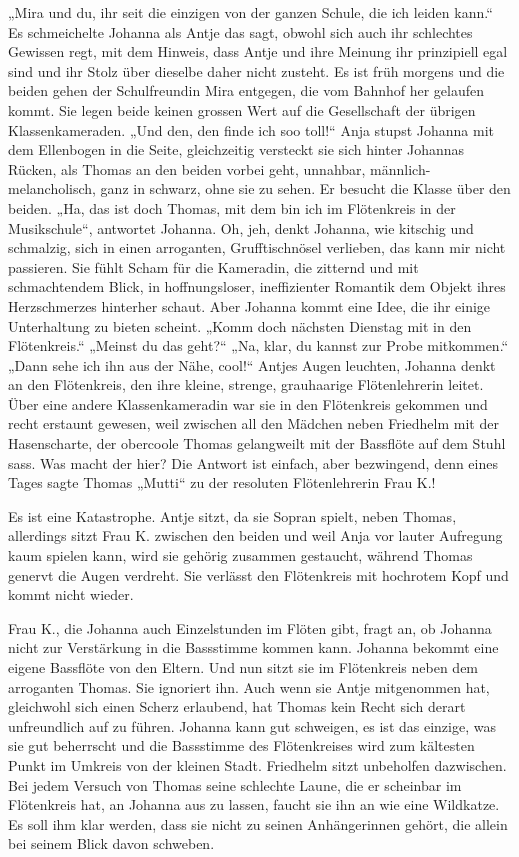 \documentclass[10pt,a5paper]{book}
\begin{document}
„Mira und du, ihr seit die einzigen von der ganzen Schule, die ich leiden kann.“ Es schmeichelte Johanna als Antje das sagt, obwohl sich auch ihr schlechtes Gewissen regt, mit dem Hinweis, dass Antje und ihre Meinung ihr prinzipiell egal sind und ihr Stolz über dieselbe daher  nicht zusteht. Es ist früh morgens und die beiden gehen der Schulfreundin Mira entgegen, die vom Bahnhof her gelaufen kommt. Sie legen beide keinen grossen Wert auf die Gesellschaft der übrigen Klassenkameraden. „Und den, den finde ich soo toll!“ Anja stupst Johanna mit dem Ellenbogen in die Seite, gleichzeitig versteckt sie sich hinter Johannas Rücken, als Thomas an den beiden vorbei geht, unnahbar, männlich-melancholisch, ganz in schwarz, ohne sie zu sehen. Er besucht die Klasse über den beiden. „Ha, das ist doch Thomas, mit dem bin ich im Flötenkreis in der Musikschule“, antwortet Johanna. Oh, jeh, denkt Johanna, wie kitschig und schmalzig, sich in einen arroganten, Grufftischnösel verlieben, das kann mir nicht passieren. Sie fühlt Scham für die Kameradin, die zitternd und mit schmachtendem Blick, in hoffnungsloser, ineffizienter Romantik dem Objekt ihres Herzschmerzes hinterher schaut. Aber Johanna kommt eine Idee, die ihr einige Unterhaltung zu bieten scheint. „Komm doch nächsten Dienstag mit in den Flötenkreis.“ „Meinst du das geht?“ „Na, klar, du kannst zur Probe mitkommen.“ „Dann sehe ich ihn aus der Nähe, cool!“ Antjes Augen leuchten, Johanna denkt an den Flötenkreis, den ihre kleine, strenge, grauhaarige Flötenlehrerin leitet. Über eine andere Klassenkameradin war sie in den Flötenkreis gekommen und recht erstaunt gewesen, weil zwischen all den Mädchen neben Friedhelm mit der Hasenscharte, der obercoole Thomas gelangweilt mit der Bassflöte auf dem Stuhl sass. Was macht der hier? Die Antwort  ist einfach, aber bezwingend, denn eines Tages sagte Thomas „Mutti“ zu der resoluten Flötenlehrerin Frau K.!

Es ist eine Katastrophe. Antje sitzt, da sie Sopran spielt, neben Thomas, allerdings sitzt Frau K. zwischen den beiden und weil Anja vor lauter Aufregung kaum spielen kann, wird sie gehörig zusammen gestaucht, während Thomas genervt die Augen verdreht. Sie verlässt den Flötenkreis mit hochrotem Kopf und kommt nicht wieder. 

Frau K., die Johanna auch Einzelstunden im Flöten gibt, fragt an, ob Johanna nicht zur Verstärkung in die Bassstimme kommen kann. Johanna bekommt eine eigene Bassflöte von den Eltern. Und nun sitzt sie im Flötenkreis neben dem arroganten Thomas. Sie ignoriert ihn. Auch wenn sie Antje mitgenommen hat, gleichwohl sich einen Scherz erlaubend, hat Thomas kein Recht sich derart unfreundlich auf zu führen. Johanna kann gut schweigen, es ist das einzige, was sie gut beherrscht und die Bassstimme des Flötenkreises  wird zum kältesten Punkt im Umkreis von der kleinen Stadt. Friedhelm sitzt unbeholfen dazwischen. Bei jedem Versuch von Thomas seine schlechte Laune, die er scheinbar im Flötenkreis hat, an Johanna aus zu lassen, faucht sie ihn an wie eine Wildkatze. Es soll ihm klar werden, dass sie nicht zu seinen Anhängerinnen gehört, die allein bei seinem Blick davon schweben. 
\end{document}
